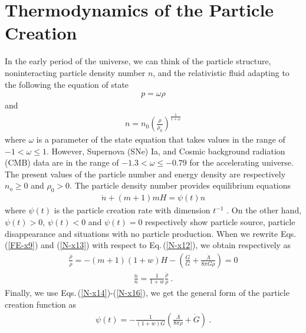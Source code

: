\documentclass[superscriptaddress,showpacs,pre,twocolumn]{revtex4-1}
\begin{document}
\section{Thermodynamics of the Particle Creation}

In the early period of the universe, we can think of the particle structure, noninteracting particle density number $n$, and the relativistic fluid adapting to the following the equation of state
\begin{eqnarray} \label{N-x12}
p = \omega \rho
\end{eqnarray}
and 
\begin{eqnarray} \label{N-x13}
n = n_{0} \left(\frac{\rho}{\rho_{0}}  \right)^{\frac{1}{1+\omega}}
\end{eqnarray}
where $\omega$ is a parameter of the state equation that takes values in the range of $-1<\omega \le 1$. However, Supernova (SNe) Ia, and Cosmic background radiation (CMB) data are in the range of $-1.3<\omega\le-0.79$ for the accelerating universe. The present values of the particle number and energy density are respectively $n_{o} \geq 0$ and $\rho_{0} >0$. The particle density number provides equilibrium equations \cite{Prigogine1988,Prigogine1989}
\begin{eqnarray} \label{N-x14}
\dot{n} + \left(m +1 \right)m H = \psi (t) n
\end{eqnarray}
where $\psi(t)$ is the particle creation rate with dimension $t^{-1}$ \cite{xHarko1999,xLima1990}. On the other hand, $\psi(t) >0$, $\psi(t)<0$ and $\psi(t)=0$ respectively show particle source, particle disappearance and situations with no particle production. When we rewrite Eqs.\,(\ref{FE-x9}) and (\ref{N-x13}) with respect to Eq.\,(\ref{N-x12}), we obtain respectively as
\begin{eqnarray} \label{N-x15}
\frac{\dot{\rho}}{\rho} = - (m+1) (1+w) H - \left( \frac{\dot{G}}{G} + \frac{\dot{\Lambda}}{8 \pi G \rho}   \right) = 0
\end{eqnarray}
\begin{eqnarray} \label{N-x16}
\frac{\dot{n}}{n} = \frac{1}{1+w} \frac{\dot{\rho}}{\rho} \ .
\end{eqnarray}
Finally, we use Eqs.\,(\ref{N-x14})-(\ref{N-x16}), we get the general form of the particle creation function as
\begin{eqnarray} \label{N-x17}
\psi(t) = -\frac{1}{(1+w)G} \left( \frac{\dot{\Lambda}}{8\pi \rho} + \dot{G} \right) \ .
\end{eqnarray}
\end{document}
